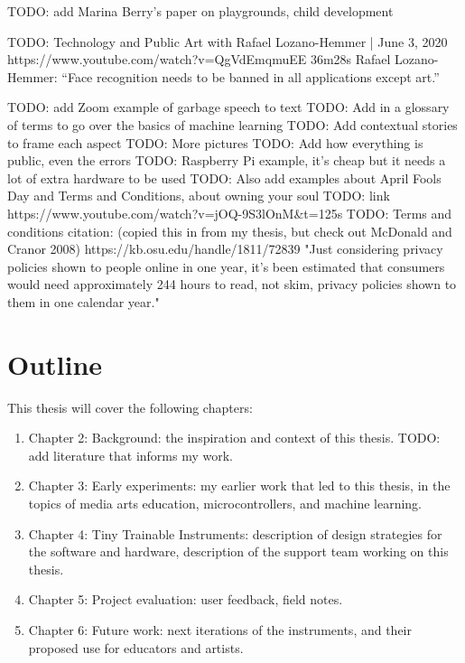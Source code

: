 TODO: add Marina Berry’s paper on playgrounds, child development

TODO: Technology and Public Art with Rafael Lozano-Hemmer | June 3, 2020
https://www.youtube.com/watch?v=QgVdEmqmuEE
36m28s
Rafael Lozano-Hemmer: “Face recognition needs to be banned in all applications except art.”

TODO: add Zoom example of garbage speech to text
TODO: Add in a glossary of terms to go over the basics of machine learning
TODO: Add contextual stories to frame each aspect
TODO: More pictures
TODO: Add how everything is public, even the errors
TODO: Raspberry Pi example, it’s cheap but it needs a lot of extra hardware to be used
TODO: Also add examples about April Fools Day and Terms and Conditions, about owning your soul
TODO: link https://www.youtube.com/watch?v=jOQ-9S3lOnM\&t=125s
TODO: Terms and conditions citation: (copied this in from my thesis, but check out McDonald and Cranor 2008) https://kb.osu.edu/handle/1811/72839 "Just considering privacy policies shown to people online in one year, it's been estimated that consumers would need approximately 244 hours to read, not skim, privacy policies shown to them in one calendar year."


\section{Outline}

This thesis will cover the following chapters:

\begin{enumerate}
        \item Chapter 2: Background: the inspiration and context of this thesis. TODO: add literature that informs my work.
    \item Chapter 3: Early experiments: my earlier work that led to this thesis, in the topics of media arts education, microcontrollers, and machine learning.
    \item Chapter 4: Tiny Trainable Instruments: description of design strategies for the software and hardware, description of the support team working on this thesis.
    \item Chapter 5: Project evaluation: user feedback, field notes.
    \item Chapter 6: Future work: next iterations of the instruments, and their proposed use for educators and artists.
  \end{enumerate}
